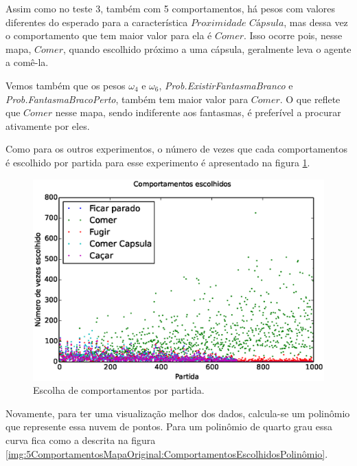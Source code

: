 Assim como no teste 3, também com 5 comportamentos, há pesos com valores diferentes do esperado para a característica $ \textit{Proximidade Cápsula} $, mas dessa vez o comportamento que tem maior valor para ela é $ Comer $. Isso ocorre pois, nesse mapa, $ Comer $, quando escolhido próximo a uma cápsula, geralmente leva o agente a comê-la.

Vemos também que os pesos $ \omega_4 $ e $ \omega_6 $, \textit{Prob.ExistirFantasmaBranco} e \textit{Prob.FantasmaBracoPerto}, também tem maior valor para $ Comer $. O que reflete que $ Comer $ nesse mapa, sendo indiferente aos fantasmas, é preferível a procurar ativamente por eles.

Como para os outros experimentos, o número de vezes que cada comportamentos é escolhido por partida para esse experimento é apresentado na figura \ref{img:5ComportamentosMapaOriginal:ComportamentosEscolhidos}.

\begin{figure}[h]
    \centering
    \includegraphics[width=\linewidth]{images/5_behaviors_original_map/chosen_behaviors}
    \caption{Escolha de comportamentos por partida.}
    \label{img:5ComportamentosMapaOriginal:ComportamentosEscolhidos}
\end{figure}

Novamente, para ter uma visualização melhor dos dados, calcula-se um polinômio que represente essa nuvem de pontos. Para um polinômio de quarto grau essa curva fica como a descrita na figura \ref{img:5ComportamentosMapaOriginal:ComportamentosEscolhidosPolinômio}.

